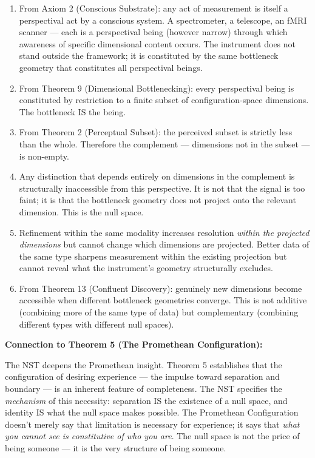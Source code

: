 \begin{enumerate}[nosep,leftmargin=*]
  \item From Axiom 2 (Conscious Substrate): any act of measurement is itself a perspectival act by a conscious system. A spectrometer, a telescope, an fMRI scanner — each is a perspectival being (however narrow) through which awareness of specific dimensional content occurs. The instrument does not stand outside the framework; it is constituted by the same bottleneck geometry that constitutes all perspectival beings.
  \item From Theorem 9 (Dimensional Bottlenecking): every perspectival being is constituted by restriction to a finite subset of configuration-space dimensions. The bottleneck IS the being.
  \item From Theorem 2 (Perceptual Subset): the perceived subset is strictly less than the whole. Therefore the complement — dimensions not in the subset — is non-empty.
  \item Any distinction that depends entirely on dimensions in the complement is structurally inaccessible from this perspective. It is not that the signal is too faint; it is that the bottleneck geometry does not project onto the relevant dimension. This is the null space.
  \item Refinement within the same modality increases resolution \textit{within the projected dimensions} but cannot change which dimensions are projected. Better data of the same type sharpens measurement within the existing projection but cannot reveal what the instrument's geometry structurally excludes.
  \item From Theorem 13 (Confluent Discovery): genuinely new dimensions become accessible when different bottleneck geometries converge. This is not additive (combining more of the same type of data) but complementary (combining different types with different null spaces).
\end{enumerate}


\textbf{Connection to Theorem 5 (The Promethean Configuration):}


The NST deepens the Promethean insight. Theorem 5 establishes that the configuration of desiring experience — the impulse toward separation and boundary — is an inherent feature of completeness. The NST specifies the \textit{mechanism} of this necessity: separation IS the existence of a null space, and identity IS what the null space makes possible. The Promethean Configuration doesn't merely say that limitation is necessary for experience; it says that \textit{what you cannot see is constitutive of who you are}. The null space is not the price of being someone — it is the very structure of being someone.


